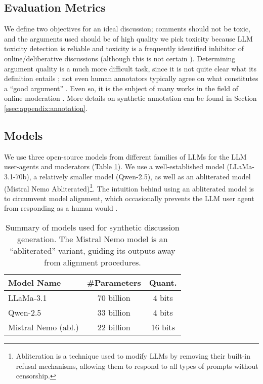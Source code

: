 \subsection{Evaluation Metrics}

We define two objectives for an ideal discussion; comments should not be toxic, and the arguments used should be of high quality we pick toxicity because \ac{LLM} toxicity detection is reliable \citep{kang-qian-2024-implanting, Wang2022ToxicityDW, anjum2024hate} and toxicity is a frequently identified inhibitor of online/deliberative discussions \citep{dekock2022disagree, XiaToxicity} (although this is not certain \citep{Avalle2024PersistentIP}). Determining argument quality is a much more difficult task, since it is not quite clear what its definition entails \cite{korre2025evaluation}; not even human annotators typically agree on what constitutes a “good argument” \cite{argyle2023}. Even so, it is the subject of many works in the field of online moderation \cite{argyle2023, schroeder-etal-2024-fora, falk-etal-2024-moderation, falk-etal-2021-predicting}. More details on synthetic annotation can be found in Section \ref{ssec:appendix:annotation}.


\subsection{Models}
\label{ssec:experimental:model}

We use three open-source models from different families of \acp{LLM} for the \ac{LLM} user-agents and moderators (Table \ref{tab:models}). We use a well-established model (LLaMa-3.1-70b), a relatively smaller model (Qwen-2.5), as well as an abliterated \cite{arditi_abliteration} model (Mistral Nemo Abliterated)\footnote{Abliteration is a technique used to modify \acp{LLM} by removing their built-in refusal mechanisms, allowing them to respond to all types of prompts without censorship.}. The intuition behind using an abliterated model is to circumvent model alignment, which occasionally prevents the \ac{LLM} user agent from responding as a human would \cite{Park2023GenerativeAI}.

\begin{table}[ht]
\centering
    \begin{tabular}{|l|c|c|}
        \hline
        \textbf{Model Name} & \textbf{\#Parameters} & \textbf{Quant.} \\
        \hline
        LLaMa-3.1 & 70 billion & 4 bits \\
        Qwen-2.5 & 33 billion & 4 bits \\
        Mistral Nemo (abl.) & 22 billion & 16 bits\\
        \hline
    \end{tabular}
\caption{Summary of models used for synthetic discussion generation. The Mistral Nemo model is an “abliterated” variant, guiding its outputs away from alignment procedures.}
\label{tab:models}
\end{table}


